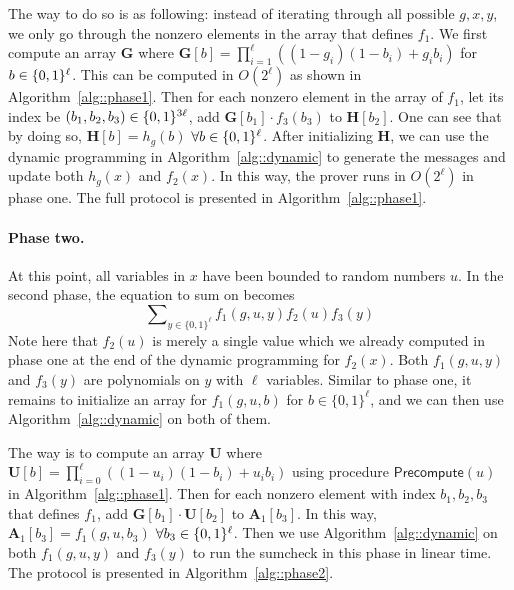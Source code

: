 The way to do so is as following: instead of iterating through all possible $g,x,y$, we only go through the nonzero elements in the array that defines $f_1$. We first compute an array \textbf{G} where $\textbf{G}[b] = \prod_{i=1}^\ell ((1-g_i)(1-b_i)+g_ib_i)$ for $b\in\{0,1\}^\ell$. This can be computed in $O(2^\ell)$ as shown in Algorithm~\ref{alg::phase1}. Then for each nonzero element in the array of $f_1$, let its index be $(b_1,b_2,b_3) \in\{0,1\}^{3\ell}$, add $\textbf{G}[b_1]\cdot f_3(b_3)$ to $\textbf{H}[b_2]$. One can see that by doing so, $\textbf{H}[b] = h_g(b)$ $\forall b\in\{0,1\}^\ell$. After initializing $\textbf{H}$, we can use the dynamic programming in Algorithm~\ref{alg::dynamic} to generate the messages and update both $h_g(x)$ and $f_2(x)$. In this way, the prover runs in $O(2^\ell)$ in phase one. The full protocol is presented in Algorithm~\ref{alg::phase1}.


\paragraph{Phase two.} At this point, all variables in $x$ have been bounded to random numbers $u$. In the second phase, the equation to sum on becomes 
\[
\sum\nolimits_{y\in\{0,1\}^\ell}f_1(g,u,y)f_2(u)f_3(y)
\]
Note here that $f_2(u)$ is merely a single value which we already computed in phase one at the end of the dynamic programming for $f_2(x)$. Both $f_1(g,u,y)$ and $f_3(y)$ are polynomials on $y$ with $\ell$ variables. Similar to phase one, it remains to initialize an array for $f_1(g,u,b)$ for $b\in\{0,1\}^\ell$, and we can then use Algorithm~\ref{alg::dynamic} on both of them.

The way is to compute an array \textbf{U} where $\textbf{U}[b] = \prod_{i=0}^\ell ((1-u_i)(1-b_i)+u_ib_i)$ using procedure $\mathsf{Precompute}(u)$ in Algorithm~\ref{alg::phase1}. Then for each nonzero element with index $b_1,b_2,b_3$ that defines $f_1$, add $\textbf{G}[b_1]\cdot\textbf{U}[b_2]$ to $\textbf{A}_1[b_3]$. In this way, $\textbf{A}_1[b_3]=f_1(g,u,b_3)$ $\forall b_3\in\{0,1\}^\ell$. Then we use Algorithm~\ref{alg::dynamic} on both $f_1(g,u,y)$ and $f_3(y)$ to run the sumcheck in this phase in linear time. The protocol is presented in Algorithm~\ref{alg::phase2}.


